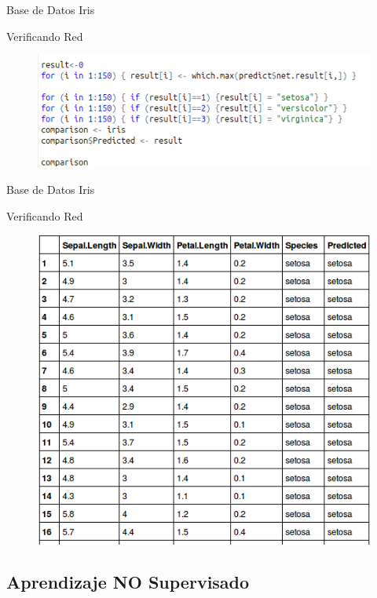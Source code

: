 \documentclass{beamer}
\begin{document}
\begin{frame}{Base de Datos Iris}
\begin{block}{Verificando Red}
\begin{figure}
\includegraphics[scale=0.4]{comparando.png}
\centering
\end{figure}
\end{block}
\end{frame}

\begin{frame}{Base de Datos Iris}
\begin{block}{Verificando Red}
\begin{figure}
\includegraphics[scale=0.4]{comparacion.png}
\centering
\end{figure}
\end{block}
\end{frame}

\subsection{Aprendizaje NO Supervisado}
\end{document}
